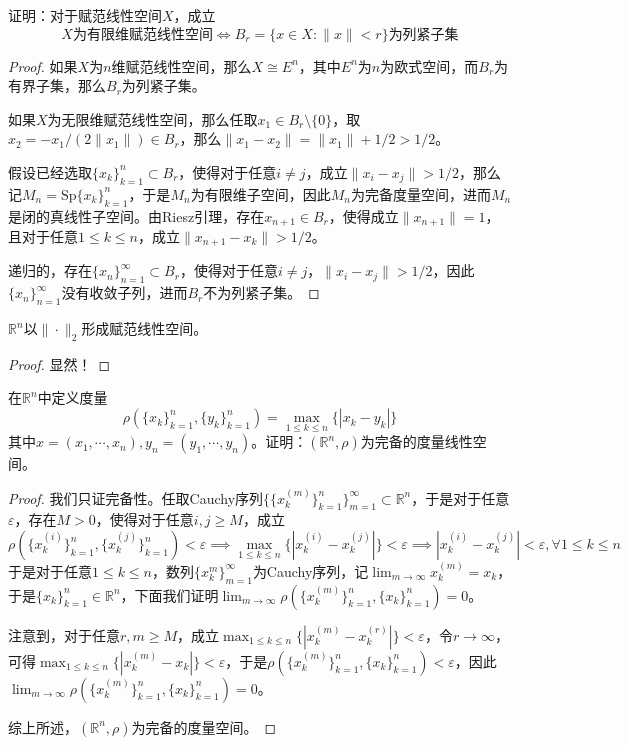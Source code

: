 \documentclass[lang = cn, scheme = chinese, 10pt]{elegantbook}
\newcommand{\R}{\mathbb{R}}  %
\newcommand{\sub}{\subset}   %
\begin{document}
\begin{proposition}
	证明：对于赋范线性空间$X$，成立
	$$
	X\text{为有限维赋范线性空间}\iff
	B_r=\{ x\in X:\|x\|< r \}\text{为列紧子集}
	$$
\end{proposition}

\begin{proof}
	如果$X$为$n$维赋范线性空间，那么$X\cong E^n$，其中$E^n$为$n$为欧式空间，而$B_r$为有界子集，那么$B_r$为列紧子集。
	
	如果$X$为无限维赋范线性空间，那么任取$x_1\in B_r\setminus\{0\}$，取$x_2=-x_1/(2\|x_1\|)\in B_r$，那么$\|x_1-x_2\|=\|x_1\|+1/2>1/2$。
	
	假设已经选取$\{ x_k \}_{k=1}^{n}\subset B_r$，使得对于任意$i\ne j$，成立$\|x_i-x_j\|>1/2$，那么记$M_n=\mathrm{Sp}\{ x_k \}_{k=1}^{n}$，于是$M_n$为有限维子空间，因此$M_n$为完备度量空间，进而$M_n$是闭的真线性子空间。由Riesz引理，存在$x_{n+1}\in B_r$，使得成立$\|x_{n+1}\|=1$，且对于任意$1\le k\le n$，成立$\|x_{n+1}-x_k\|>1/2$。
	
	递归的，存在$\{ x_n \}_{n=1}^{\infty}\subset B_r$，使得对于任意$i\ne j$，$\|x_i-x_j\|>1/2$，因此$\{ x_n \}_{n=1}^{\infty}$没有收敛子列，进而$B_r$不为列紧子集。
\end{proof}

\begin{proposition}
	$\R^n$以$\|\cdot\|_2$形成赋范线性空间。
\end{proposition}

\begin{proof}
	显然！
\end{proof}

\begin{proposition}
	在$\R^n$中定义度量
	$$
	\rho(\{x_k\}_{k=1}^n,\{y_k\}_{k=1}^n)=\max_{1\le k\le n}\{ |x_k-y_k| \}
	$$
	其中$x=(x_1,\cdots,x_n),y_n=(y_1,\cdots,y_n)$。证明：$( \R^n,\rho )$为完备的度量线性空间。
\end{proposition}

\begin{proof}
	我们只证完备性。任取Cauchy序列$\{ \{ x_k^{(m)} \}_{k=1}^{n} \}_{m=1}^{\infty}\sub\R^n$，于是对于任意$\varepsilon$，存在$M>0$，使得对于任意$i,j\ge M$，成立
	$$
	\rho(\{x_k^{(i)}\}_{k=1}^n,\{x_k^{(j)}\}_{k=1}^n)<\varepsilon
	\implies \max_{1\le k\le n}\{ |x_k^{(i)}-x_k^{(j)}| \}<\varepsilon
	\implies |x_k^{(i)}-x_k^{(j)}|<\varepsilon,\forall 1\le k\le n
	$$
	于是对于任意$1\le k\le n$，数列$\{ x_k^{m} \}_{m=1}^\infty$为Cauchy序列，记$\displaystyle \lim_{m\to\infty} x_k^{(m)}=x_k$，于是$\{x_k\}_{k=1}^{n}\in \R^n$，下面我们证明$\displaystyle \lim_{m\to\infty}\rho(\{x_k^{(m)}\}_{k=1}^n,\{x_k\}_{k=1}^n)=0$。
	
	注意到，对于任意$r,m\ge M$，成立$\displaystyle\max_{1\le k\le n}\{ |x_k^{(m)}-x_k^{(r)}| \}<\varepsilon$，令$r\to\infty$，可得$\displaystyle\max_{1\le k\le n}\{ |x_k^{(m)}-x_k| \}<\varepsilon$，于是$\rho(\{x_k^{(m)}\}_{k=1}^n,\{x_k\}_{k=1}^n)<\varepsilon$，因此$\displaystyle \lim_{m\to\infty}\rho(\{x_k^{(m)}\}_{k=1}^n,\{x_k\}_{k=1}^n)=0$。
	
	综上所述，$(\R^n,\rho)$为完备的度量空间。
\end{proof}
\end{document}
